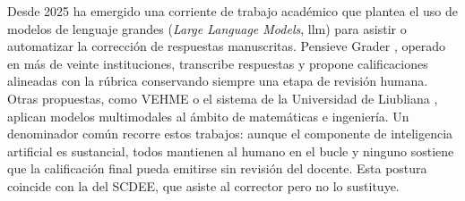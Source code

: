 Desde 2025 ha emergido una corriente de trabajo académico que plantea el
uso de modelos de lenguaje grandes (\textit{Large Language Models},
\acs{llm}) para asistir o automatizar la corrección de respuestas
manuscritas. Pensieve Grader \cite{yang2025pensieve}, operado en más de
veinte instituciones, transcribe respuestas y propone calificaciones
alineadas con la rúbrica conservando siempre una etapa de revisión humana.
Otras propuestas, como VEHME \cite{nguyen2025vehme} o el sistema de la
Universidad de Liubliana \cite{pers2026grading}, aplican modelos
multimodales al ámbito de matemáticas e ingeniería. Un denominador común
recorre estos trabajos: aunque el componente de inteligencia artificial es
sustancial, todos mantienen al humano en el bucle y ninguno sostiene que
la calificación final pueda emitirse sin revisión del docente. Esta
postura coincide con la del SCDEE, que asiste al corrector pero no lo
sustituye.
